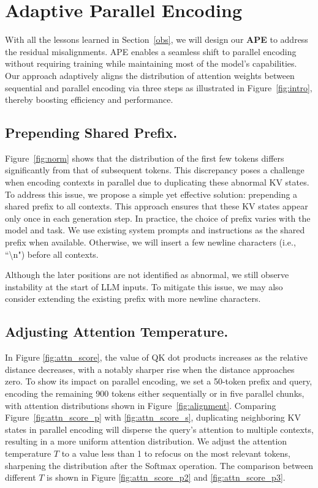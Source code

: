 \section{Adaptive Parallel Encoding}
With all the lessons learned in Section~\ref{obs}, we will design our \textbf{APE} to address the residual misalignments. APE enables a seamless shift to parallel encoding without requiring training while maintaining most of the model's capabilities. Our approach adaptively aligns the distribution of attention weights between sequential and parallel encoding via three steps as illustrated in Figure~\ref{fig:intro}, thereby boosting efficiency and performance. 

\subsection{Prepending Shared Prefix.}
\label{sec:shared_prefix}
Figure~\ref{fig:norm} shows that the distribution of the first few tokens differs significantly from that of subsequent tokens. This discrepancy poses a challenge when encoding contexts in parallel due to duplicating these abnormal KV states. To address this issue, we propose a simple yet effective solution: prepending a shared prefix to all contexts. This approach ensures that these KV states appear only once in each generation step. In practice, the choice of prefix varies with the model and task. We use existing system prompts and instructions as the shared prefix when available. Otherwise, we will insert a few newline characters (i.e., ``\textbackslash n") before all contexts.

Although the later positions are not identified as abnormal, we still observe instability at the start of LLM inputs. To mitigate this issue, we may also consider extending the existing prefix with more newline characters.



\subsection{Adjusting Attention Temperature.}

In Figure \ref{fig:attn_score}, the value of QK dot products increases as the relative distance decreases, with a notably sharper rise when the distance approaches zero. To show its impact on parallel encoding, we set a 50-token prefix and query, encoding the remaining 900 tokens either sequentially or in five parallel chunks, with attention distributions shown in Figure~\ref{fig:alignment}. 
Comparing Figure~\ref{fig:attn_score_p} with \ref{fig:attn_score_s}, duplicating neighboring KV states in parallel encoding will disperse the query's attention to multiple contexts, resulting in a more uniform attention distribution. We adjust the attention temperature $T$ to a value less than 1 to refocus on the most relevant tokens, sharpening the distribution after the $\mathrm{Softmax}$ operation. The comparison between different $T$ is shown in Figure \ref{fig:attn_score_p2} and \ref{fig:attn_score_p3}.

